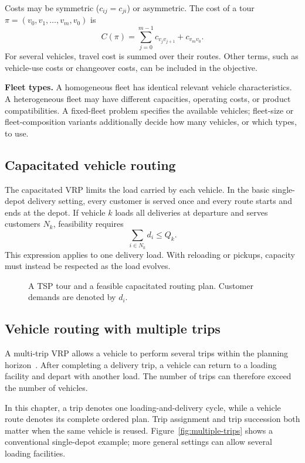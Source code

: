 Costs may be symmetric ($c_{ij}=c_{ji}$) or asymmetric. The cost of a tour
$\pi=(v_0,v_1,\ldots,v_m,v_0)$ is
\[
 C(\pi)=\sum_{j=0}^{m-1}c_{v_jv_{j+1}}+c_{v_mv_0}.
\]
For several vehicles, travel cost is summed over their routes. Other terms,
such as vehicle-use costs or changeover costs, can be included in the objective.

\textbf{Fleet types.} A homogeneous fleet has identical relevant vehicle
characteristics. A heterogeneous fleet may have different capacities,
operating costs, or product compatibilities. A fixed-fleet problem specifies
the available vehicles; fleet-size or fleet-composition variants additionally
decide how many vehicles, or which types, to use.

\subsection{Capacitated vehicle routing}

The capacitated VRP limits the load carried by each vehicle. In the basic
single-depot delivery setting, every customer is served once and every route
starts and ends at the depot. If vehicle $k$ loads all deliveries at departure
and serves customers $N_k$, feasibility requires
\[
 \sum_{i\in N_k}d_i\leq Q_k.
\]
This expression applies to one delivery load. With reloading or pickups,
capacity must instead be respected as the load evolves.

\begin{figure}[htbp]
 \centering
 
 \caption{A TSP tour and a feasible capacitated routing plan. Customer demands
 are denoted by $d_i$.}
 \label{fig:background-routes}
\end{figure}

\subsection{Vehicle routing with multiple trips}

A multi-trip VRP allows a vehicle to perform several trips within the planning
horizon~\cite{cattaruzza2016multipletrips}. After completing a delivery trip,
a vehicle can return to a loading facility and depart with another load.
The number of trips can therefore exceed the number of vehicles.

In this chapter, a trip denotes one loading-and-delivery cycle, while a vehicle
route denotes its complete ordered plan. Trip assignment and trip succession
both matter when the same vehicle is reused. Figure~\ref{fig:multiple-trips}
shows a conventional single-depot example; more general settings can allow
several loading facilities.

